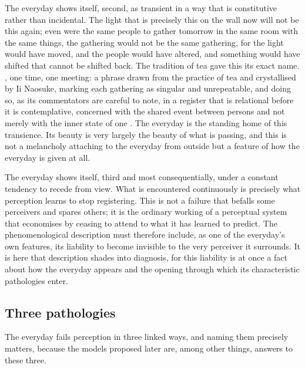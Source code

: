 The everyday shows itself, second, as transient in a way that is constitutive rather than incidental. The light that is precisely this on the wall now will not be this again; even were the same people to gather tomorrow in the same room with the same things, the gathering would not be the same gathering, for the light would have moved, and the people would have altered, and something would have shifted that cannot be shifted back. The tradition of tea gave this its exact name. , one time, one meeting: a phrase drawn from the practice of tea and crystallised by Ii Naosuke, marking each gathering as singular and unrepeatable, and doing so, as its commentators are careful to note, in a register that is relational before it is contemplative, concerned with the shared event between persons and not merely with the inner state of one \parencite{saito2007}. The everyday is the standing home of this transience. Its beauty is very largely the beauty of what is passing, and this is not a melancholy attaching to the everyday from outside but a feature of how the everyday is given at all.

The everyday shows itself, third and most consequentially, under a constant tendency to recede from view. What is encountered continuously is precisely what perception learns to stop registering. This is not a failure that befalls some perceivers and spares others; it is the ordinary working of a perceptual system that economises by ceasing to attend to what it has learned to predict. The phenomenological description must therefore include, as one of the everyday's own features, its liability to become invisible to the very perceiver it surrounds. It is here that description shades into diagnosis, for this liability is at once a fact about how the everyday appears and the opening through which its characteristic pathologies enter.

\subsection{Three pathologies}
\label{p23:sub:diag-pathologies}

The everyday fails perception in three linked ways, and naming them precisely matters, because the models proposed later are, among other things, answers to these three.

